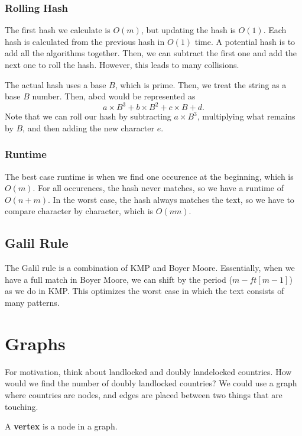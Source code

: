 \documentclass[a4paper]{article}
\begin{document}
\subsubsection{Rolling Hash}
The first hash we calculate is \( O(m) \), but updating the hash is \( O(1) \). Each hash is calculated from the previous hash in \( O(1) \) time. A potential hash is to add all the algorithms together. Then, we can subtract the first one and add the next one to roll the hash. However, this leads to many collisions.

The actual hash uses a base \( B \), which is prime. Then, we treat the string as a base \( B \) number. Then, abcd would be represented as \[
	a \times B^3 + b \times B^2 + c \times B + d
.\] Note that we can roll our hash by subtracting \( a \times B^3 \), multiplying what remains by \( B \), and then adding the new character \( e \). 

\subsubsection{Runtime}
The best case runtime is when we find one occurence at the beginning, which is \( O(m) \). For all occurences, the hash never matches, so we have a runtime of \( O(n+m) \). In the worst case, the hash always matches the text, so we have to compare character by character, which is \( O(nm) \). 

\subsection{Galil Rule}
The Galil rule is a combination of KMP and Boyer Moore. Essentially, when we have a full match in Boyer Moore, we can shift by the period (\( m-ft[m-1] \)) as we do in KMP. This optimizes the worst case in which the text consists of many patterns.


\section{Graphs}

For motivation, think about landlocked and doubly landelocked countries. How would we find the number of doubly landlocked countries? We could use a graph where countries are nodes, and edges are placed between two things that are touching.

\begin{definition}
	A \textbf{vertex} is a node in a graph. 
\end{definition}
\end{document}
